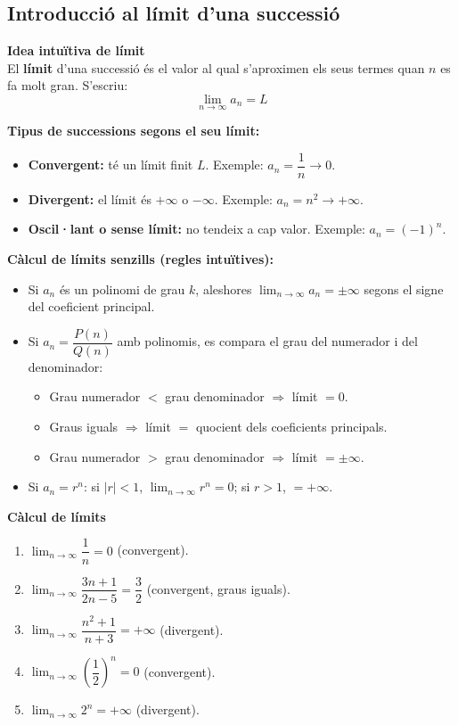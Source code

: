 \documentclass[12pt]{article}
\begin{document}
\subsection{Introducció al límit d'una successió}

\begin{concept}
\textbf{Idea intuïtiva de límit}\\
El \textbf{límit} d'una successió és el valor al qual s'aproximen els seus termes quan $n$ es fa molt gran. S'escriu:
\[
\lim_{n \to \infty} a_n = L
\]

\textbf{Tipus de successions segons el seu límit:}
\begin{itemize}
    \item \textbf{Convergent:} té un límit finit $L$. Exemple: $a_n = \dfrac{1}{n} \to 0$.
    \item \textbf{Divergent:} el límit és $+\infty$ o $-\infty$. Exemple: $a_n = n^2 \to +\infty$.
    \item \textbf{Oscil·lant o sense límit:} no tendeix a cap valor. Exemple: $a_n = (-1)^n$.
\end{itemize}

\textbf{Càlcul de límits senzills (regles intuïtives):}
\begin{itemize}
    \item Si $a_n$ és un polinomi de grau $k$, aleshores $\lim_{n\to\infty} a_n = \pm\infty$ segons el signe del coeficient principal.
    \item Si $a_n = \dfrac{P(n)}{Q(n)}$ amb polinomis, es compara el grau del numerador i del denominador:
    \begin{itemize}
        \item Grau numerador $<$ grau denominador $\Rightarrow$ límit $= 0$.
        \item Graus iguals $\Rightarrow$ límit $=$ quocient dels coeficients principals.
        \item Grau numerador $>$ grau denominador $\Rightarrow$ límit $=\pm\infty$.
    \end{itemize}
    \item Si $a_n = r^n$: si $|r| < 1$, $\lim_{n\to\infty} r^n = 0$; si $r > 1$, $= +\infty$.
\end{itemize}
\end{concept}

\begin{exemple}
\textbf{Càlcul de límits}
\begin{enumerate}[label=\alph*)]
    \item $\displaystyle\lim_{n\to\infty} \dfrac{1}{n} = 0$ (convergent).
    \item $\displaystyle\lim_{n\to\infty} \dfrac{3n+1}{2n-5} = \dfrac{3}{2}$ (convergent, graus iguals).
    \item $\displaystyle\lim_{n\to\infty} \dfrac{n^2+1}{n+3} = +\infty$ (divergent).
    \item $\displaystyle\lim_{n\to\infty} \left(\dfrac{1}{2}\right)^n = 0$ (convergent).
    \item $\displaystyle\lim_{n\to\infty} 2^n = +\infty$ (divergent).
\end{enumerate}
\end{exemple}
\end{document}
